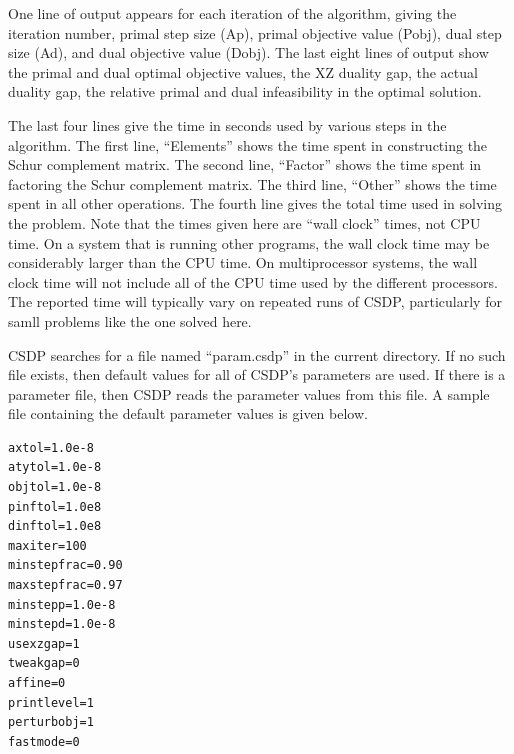 \documentclass{article}
\begin{document}
One line of output appears for each iteration of the algorithm, giving
the iteration number, primal step size (Ap), primal objective value
(Pobj), dual step size (Ad), and dual objective value (Dobj).  The
last eight lines of output show the primal and dual optimal objective
values, the XZ duality gap, the actual duality gap, the relative
primal and dual infeasibility in the optimal solution.

The last four lines give the time in seconds used by various steps in
the algorithm.  The first line, ``Elements'' shows the time spent in
constructing the Schur complement matrix.  The second line, ``Factor''
shows the time spent in factoring the Schur complement matrix.  The
third line, ``Other'' shows the time spent in all other operations.
The fourth line gives the total time used in solving the problem.
Note that the times given here are ``wall clock'' times, not CPU time.
On a system that is running other programs, the wall clock time may be
considerably larger than the CPU time.  On multiprocessor systems, the
wall clock time will not include all of the CPU time used by the
different processors.  The reported time will typically vary on
repeated runs of CSDP, particularly for samll problems like the one
solved here.

CSDP searches for a file named ``param.csdp'' in the current directory.
If no such file exists, then default values for all of CSDP's parameters
are used.  If there is a parameter file, then CSDP reads the parameter
values from this file.  A sample file containing the default parameter
values is given below.

\begin{verbatim}
axtol=1.0e-8
atytol=1.0e-8
objtol=1.0e-8
pinftol=1.0e8
dinftol=1.0e8
maxiter=100
minstepfrac=0.90
maxstepfrac=0.97
minstepp=1.0e-8
minstepd=1.0e-8
usexzgap=1
tweakgap=0
affine=0
printlevel=1
perturbobj=1
fastmode=0
\end{verbatim}
\end{document}
